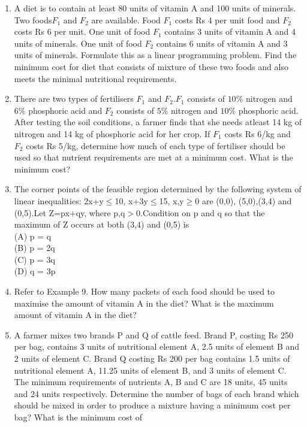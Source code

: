 \begin{enumerate}[label=\arabic*.,ref=\thesubsection.\theenumi]
\item A diet is to contain at least 80 units of vitamin A and 100 units of minerals. Two
foods$ F_{1}$ and $F_{2}$ are available. Food $F_{1}$ costs Rs 4 per unit food and $F_{2}$ costs
Rs 6 per unit. One unit of food $F_{1}$ contains 3 units of vitamin A and 4 units of
minerals. One unit of food $F_{2}$ contains 6 units of vitamin A and 3 units of minerals.
Formulate this as a linear programming problem. Find the minimum cost for diet
that consists of mixture of these two foods and also meets the minimal nutritional
requirements.\\
\item There are two types of fertilisers $F_{1}$ and $F_{2}$.$F_{1}$ consists of $10\%$ nitrogen and $6\%$
phosphoric acid and $F_{2}$ consists of $5\%$ nitrogen and $10\%$ phosphoric acid. After
testing the soil conditions, a farmer finds that she needs atleast 14 kg of nitrogen
and 14 kg of phosphoric acid for her crop. If $F_{1}$ costs Rs 6/kg and $F_{2}$ costs
Rs 5/kg, determine how much of each type of fertiliser should be used so that
nutrient requirements are met at a minimum cost. What is the minimum cost?\\
\item The corner points of the feasible region determined by the following system of
linear inequalities:
2x+y$\leq$10, x+3y$\leq$15, x,y$\geq$0 are (0,0), (5,0),(3,4) and (0,5).Let
Z=px+qy, where p,q$>$0.Condition on p and q so that the maximum of Z
occurs at both (3,4) and (0,5) is\\
(A) p = q\\
(B) p = 2q\\
(C) p = 3q\\
(D) q = 3p\\
\item Refer to Example 9. How many packets of each food should be used to maximise
the amount of vitamin A in the diet? What is the maximum amount of vitamin A
in the diet?\\
\item A farmer mixes two brands P and Q of cattle feed. Brand P, costing Rs 250 per
bag, contains 3 units of nutritional element A, 2.5 units of element B and 2 units
of element C. Brand Q costing Rs 200 per bag contains 1.5 units of nutritional
element A, 11.25 units of element B, and 3 units of element C. The minimum
requirements of nutrients A, B and C are 18 units, 45 units and 24 units respectively.
Determine the number of bags of each brand which should be mixed in order to
produce a mixture having a minimum cost per bag? What is the minimum cost of

\end{enumerate}
